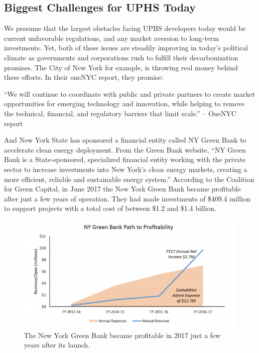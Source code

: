 \documentclass[hidelinks,12pt,a4paper]{article}
\begin{document}
\subsection{Biggest Challenges for UPHS Today}
We presume that the largest obstacles facing UPHS developers today would be current unfavorable regulations, and any market aversion to long-term investments. Yet, both of these issues are steadily improving in today's political climate as governments and corporations rush to fulfill their decarbonization promises. The City of New York for example, is throwing real money behind these efforts. In their oneNYC report, they promise:

\begin{displayquote}
“We will continue to coordinate with public and private partners to create market opportunities for emerging technology and innovation, while helping to remove the technical, financial, and regulatory barriers that limit scale.” \cite{OneNYC2050FullReport} -- OneNYC report
\end{displayquote}

And New York State has sponsored a financial entity called NY Green Bank to accelerate clean energy deployment. From the Green Bank website, “NY Green Bank is a State-sponsored, specialized financial entity working with the private sector to increase investments into New York’s clean energy markets, creating a more efficient, reliable and sustainable energy system.” \cite{NYGreenBank} According to the Coalition for Green Capital, in June 2017 the New York Green Bank became profitable after just a few years of operation. They had made investments of \$409.4 million to support projects with a total cost of between \$1.2 and \$1.4 billion. \cite{NYGreenBankPathToProfitability}

\begin{figure}[ht!]
    \centering
    \includegraphics[width=1\textwidth]{new-york-green-bank-path-to-profitability.png}
    \caption{The New York Green Bank became profitable in 2017 just a few years after its launch. \cite{NYGreenBankPathToProfitability}}
\end{figure}
\FloatBarrier
\end{document}

